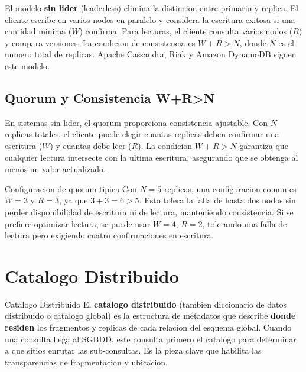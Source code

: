 \documentclass[11pt,a4paper]{article}
\begin{document}
El modelo \textbf{sin lider} (leaderless) elimina la distincion entre primario y replica. El cliente escribe en varios nodos en paralelo y considera la escritura exitosa si una cantidad minima ($W$) confirma. Para lecturas, el cliente consulta varios nodos ($R$) y compara versiones. La condicion de consistencia es $W + R > N$, donde $N$ es el numero total de replicas. Apache Cassandra, Riak y Amazon DynamoDB siguen este modelo.

\subsection{Quorum y Consistencia W+R>N}

En sistemas sin lider, el quorum proporciona consistencia ajustable. Con $N$ replicas totales, el cliente puede elegir cuantas replicas deben confirmar una escritura ($W$) y cuantas debe leer ($R$). La condicion $W + R > N$ garantiza que cualquier lectura intersecte con la ultima escritura, asegurando que se obtenga al menos un valor actualizado.

\begin{examplebox}{Configuracion de quorum tipica}
Con $N = 5$ replicas, una configuracion comun es $W = 3$ y $R = 3$, ya que $3 + 3 = 6 > 5$. Esto tolera la falla de hasta dos nodos sin perder disponibilidad de escritura ni de lectura, manteniendo consistencia. Si se prefiere optimizar lectura, se puede usar $W = 4$, $R = 2$, tolerando una falla de lectura pero exigiendo cuatro confirmaciones en escritura.
\end{examplebox}

\section{Catalogo Distribuido}

\begin{defbox}{Catalogo Distribuido}
El \textbf{catalogo distribuido} (tambien diccionario de datos distribuido o catalogo global) es la estructura de metadatos que describe \textbf{donde residen} los fragmentos y replicas de cada relacion del esquema global. Cuando una consulta llega al SGBDD, este consulta primero el catalogo para determinar a que sitios enrutar las sub-consultas. Es la pieza clave que habilita las transparencias de fragmentacion y ubicacion.
\end{defbox}
\end{document}
